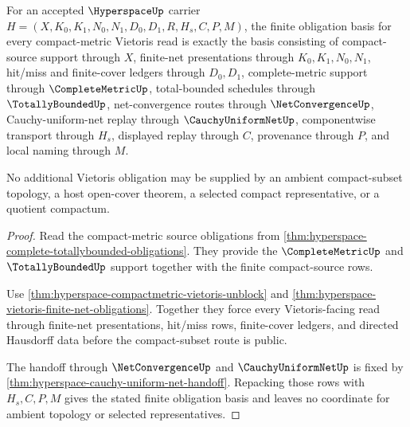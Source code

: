 \begin{theorem}
\label{thm:hyperspace-finite-vietoris-obligation-basis}
For an accepted $\HyperspaceUp$ carrier $H=(X,K_0,K_1,N_0,N_1,D_0,D_1,R,H_s,C,P,M)$, the finite obligation basis for every compact-metric Vietoris read is exactly the basis consisting of compact-source support through $X$, finite-net presentations through $K_0,K_1,N_0,N_1$, hit/miss and finite-cover ledgers through $D_0,D_1$, complete-metric support through $\CompleteMetricUp$, total-bounded schedules through $\TotallyBoundedUp$, net-convergence routes through $\NetConvergenceUp$, Cauchy-uniform-net replay through $\CauchyUniformNetUp$, componentwise transport through $H_s$, displayed replay through $C$, provenance through $P$, and local naming through $M$.

No additional Vietoris obligation may be supplied by an ambient compact-subset topology, a host open-cover theorem, a selected compact representative, or a quotient compactum.
\end{theorem}
\begin{proof}
Read the compact-metric source obligations from \autoref{thm:hyperspace-complete-totallybounded-obligations}. They provide the $\CompleteMetricUp$ and $\TotallyBoundedUp$ support together with the finite compact-source rows.

Use \autoref{thm:hyperspace-compactmetric-vietoris-unblock} and \autoref{thm:hyperspace-vietoris-finite-net-obligations}. Together they force every Vietoris-facing read through finite-net presentations, hit/miss rows, finite-cover ledgers, and directed Hausdorff data before the compact-subset route is public.

The handoff through $\NetConvergenceUp$ and $\CauchyUniformNetUp$ is fixed by \autoref{thm:hyperspace-cauchy-uniform-net-handoff}. Repacking those rows with $H_s,C,P,M$ gives the stated finite obligation basis and leaves no coordinate for ambient topology or selected representatives.
\end{proof}

